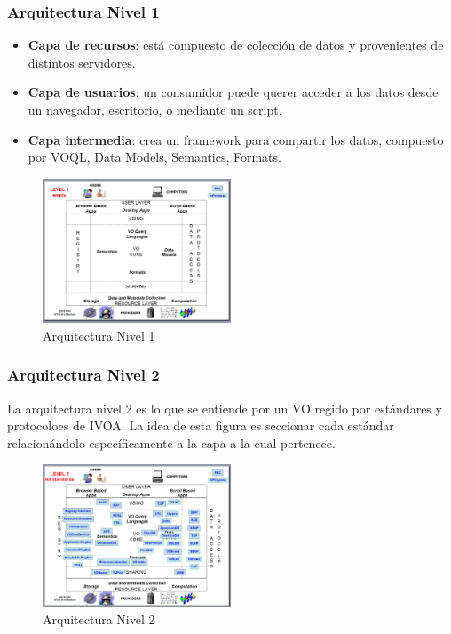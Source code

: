 \begin{frame}
\frametitle{Arquitectura Nivel 1}
\begin{multicols}{2}

\begin{itemize}
    \item \textbf{Capa de recursos}:
          está compuesto de colección de datos y provenientes de distintos
          servidores.
    \item \textbf{Capa de usuarios}:
          un consumidor puede querer acceder a los datos desde un navegador,
          escritorio, o mediante un script.
    \item \textbf{Capa intermedia}:
          crea un framework para compartir los datos, compuesto por VOQL,
          Data Models, Semantics, Formats.
\end{itemize}

\begin{figure}[h!t]
    \centering
    \includegraphics[width=0.5\textwidth]{img/arquitectura_1.png}
    \caption{Arquitectura Nivel 1}
    \label{fig:nivel1}
\end{figure}
\end{multicols}
\end{frame}

\begin{frame}
\frametitle{Arquitectura Nivel 2}
\begin{multicols}{2}

La arquitectura nivel 2 es lo que se entiende por un VO regido por estándares
y protocoloes de IVOA.
La idea de esta figura es seccionar cada estándar relacionándolo específicamente
a la capa a la cual pertenece.


\begin{figure}[h!t]
    \centering
    \includegraphics[width=0.5\textwidth]{img/arquitectura_2.png}
    \caption{Arquitectura Nivel 2}
    \label{fig:nivel2}
\end{figure}

\end{multicols}
\end{frame}
